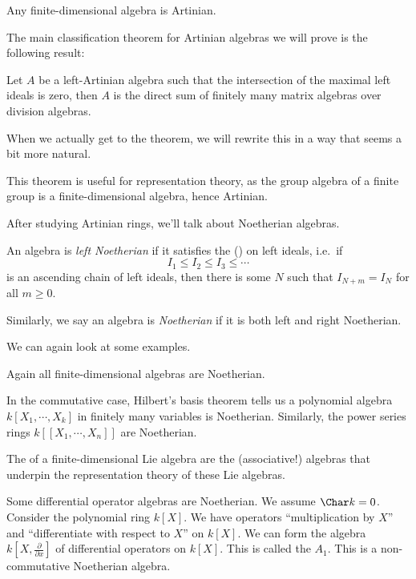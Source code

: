 \documentclass[a4paper]{article}
\begin{document}
\begin{eg}
  Any finite-dimensional algebra is Artinian.
\end{eg}

The main classification theorem for Artinian algebras we will prove is the following result:
\begin{thm}
  Let $A$ be a left-Artinian algebra such that the intersection of the maximal left ideals is zero, then $A$ is the direct sum of finitely many matrix algebras over division algebras.
\end{thm}
When we actually get to the theorem, we will rewrite this in a way that seems a bit more natural.

This theorem is useful for representation theory, as the group algebra of a finite group is a finite-dimensional algebra, hence Artinian.

After studying Artinian rings, we'll talk about Noetherian algebras.
\begin{defi}
  An algebra is \emph{left Noetherian} if it satisfies the  () on left ideals, i.e.\ if
  \[
    I_1 \leq I_2 \leq I_3 \leq \cdots
  \]
  is an ascending chain of left ideals, then there is some $N$ such that $I_{N + m} = I_N$ for all $m \geq 0$.

  Similarly, we say an algebra is \emph{Noetherian} if it is both left and right Noetherian.
\end{defi}

We can again look at some examples.
\begin{eg}
  Again all finite-dimensional algebras are Noetherian.
\end{eg}

\begin{eg}
  In the commutative case, Hilbert's basis theorem tells us a polynomial algebra $k[X_1, \cdots, X_k]$ in finitely many variables is Noetherian. Similarly, the power series rings $k[[X_1, \cdots, X_n]]$ are Noetherian.
\end{eg}

\begin{eg}
  The  of a finite-dimensional Lie algebra are the (associative!) algebras that underpin the representation theory of these Lie algebras.
\end{eg}

\begin{eg}
  Some differential operator algebras are Noetherian. We assume $\Char k = 0$. Consider the polynomial ring $k[X]$. We have operators ``multiplication by $X$'' and ``differentiate with respect to $X$'' on $k[X]$. We can form the algebra $k[X, \frac{\partial}{\partial x}]$ of differential operators on $k[X]$. This is called the  $A_1$. This is a non-commutative Noetherian algebra.
\end{eg}
\end{document}
